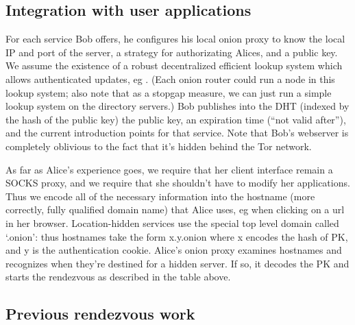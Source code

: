 \documentclass[times,10pt,twocolumn]{article}
\begin{document}

\subsection{Integration with user applications}

For each service Bob offers, he configures his local onion proxy to know
the local IP and port of the server, a strategy for authorizating Alices,
and a public key. We assume the existence of a robust decentralized
efficient lookup system which allows authenticated updates, eg
\cite{cfs:sosp01}. (Each onion router could run a node in this lookup
system; also note that as a stopgap measure, we can just run a simple
lookup system on the directory servers.)  Bob publishes into the DHT
(indexed by the hash of the public key) the public key, an expiration
time (``not valid after''), and the current introduction points for that
service. Note that Bob's webserver is completely oblivious to the fact
that it's hidden behind the Tor network.

As far as Alice's experience goes, we require that her client interface
remain a SOCKS proxy, and we require that she shouldn't have to modify
her applications. Thus we encode all of the necessary information into
the hostname (more correctly, fully qualified domain name) that Alice
uses, eg when clicking on a url in her browser. Location-hidden services
use the special top level domain called `.onion': thus hostnames take the
form x.y.onion where x encodes the hash of PK, and y is the authentication
cookie. Alice's onion proxy examines hostnames and recognizes when they're
destined for a hidden server. If so, it decodes the PK and starts the
rendezvous as described in the table above.

\subsection{Previous rendezvous work}
\end{document}
